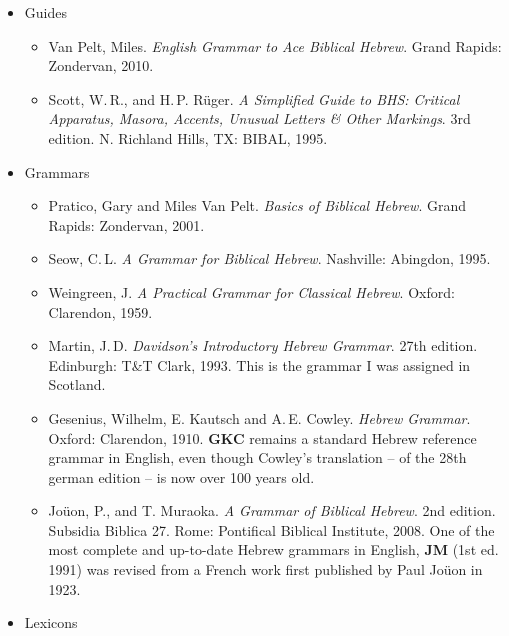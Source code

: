 \documentclass[titlepage]{article}
\begin{document}
\begin{itemize}
  \item Guides

    \begin{itemize}
      \item
        Van Pelt, Miles. \emph{English Grammar to Ace Biblical Hebrew}.
        Grand Rapids: Zondervan, 2010.
      \item
        Scott, W.\,R., and H.\,P. Rüger. \emph{A Simplified Guide to BHS:
        Critical Apparatus, Masora, Accents, Unusual Letters \& Other
        Markings}. 3rd edition. N. Richland Hills, TX: BIBAL, 1995.
    \end{itemize}

  \item Grammars

    \begin{itemize}
      \item
        Pratico, Gary and Miles Van Pelt. \emph{Basics of Biblical Hebrew}.
        Grand Rapids: Zondervan, 2001.
      \item
        Seow, C.\,L. \emph{A Grammar for Biblical Hebrew}.
        Nashville: Abingdon, 1995.
      \item
        Weingreen, J. \emph{A Practical Grammar for Classical Hebrew}.
        Oxford: Clarendon, 1959.
      \item
        Martin, J.\,D. \emph{Davidson’s Introductory Hebrew Grammar}.
        27th edition. Edinburgh: T\&T Clark, 1993. This is the grammar
        I was assigned in Scotland.
      \item
        Gesenius, Wilhelm, E. Kautsch and A.\,E. Cowley. \emph{Hebrew Grammar}.
        Oxford: Clarendon, 1910. \textbf{GKC} remains a standard Hebrew
        reference grammar in English, even though Cowley's translation
        -- of the 28th german edition -- is now over 100 years old.
      \item
      	Joüon, P., and T. Muraoka. \emph{A Grammar of Biblical Hebrew}.
      	2nd edition. Subsidia Biblica 27. Rome: Pontifical Biblical
      	Institute, 2008. One of the most complete and up-to-date
      	Hebrew grammars in English, \textbf{JM} (1st ed. 1991) was
      	revised from a French work first published by Paul Joüon in
      	1923.
    \end{itemize}

  \item Lexicons


\end{itemize}
\end{document}
